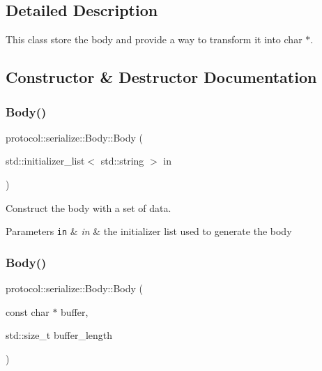 \subsection{Detailed Description}
This class store the body and provide a way to transform it into char $\ast$. 

\subsection{Constructor \& Destructor Documentation}
\mbox{\label{classprotocol_1_1serialize_1_1_body_ad7d30dfc067cb9c2cbc5c89821cd6bbe}} 
\subsubsection{\texorpdfstring{Body()}{Body()}\hspace{0.1cm}{\footnotesize\ttfamily [1/2]}}
{\footnotesize\ttfamily protocol\+::serialize\+::\+Body\+::\+Body (\begin{DoxyParamCaption}\item[{std\+::initializer\+\_\+list$<$ std\+::string $>$}]{in }\end{DoxyParamCaption})\hspace{0.3cm}{\ttfamily [noexcept]}}



Construct the body with a set of data. 


\begin{DoxyParams}[1]{Parameters}
\mbox{\tt in}  & {\em in} & the initializer list used to generate the body \\
\hline
\end{DoxyParams}
\mbox{\label{classprotocol_1_1serialize_1_1_body_ae345ba686290c375ded50efc7b4be7e6}} 
\subsubsection{\texorpdfstring{Body()}{Body()}\hspace{0.1cm}{\footnotesize\ttfamily [2/2]}}
{\footnotesize\ttfamily protocol\+::serialize\+::\+Body\+::\+Body (\begin{DoxyParamCaption}\item[{const char $\ast$}]{buffer,  }\item[{std\+::size\+\_\+t}]{buffer\+\_\+length }\end{DoxyParamCaption})\hspace{0.3cm}{\ttfamily [noexcept]}}



